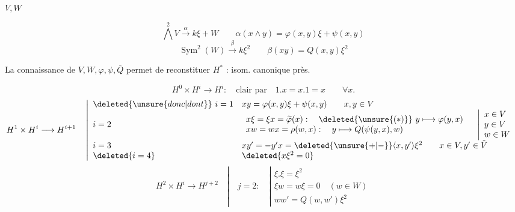 \begin{flushright}\end{flushright}

$V,W$

\[
\bigwedge^2 V\xrightarrow{\alpha}k\xi+W
\qquad \alpha(x\wedge y)=\varphi(x,y)\xi+\psi(x,y)
\]
\[
\operatorname{Sym}^2(W)\xrightarrow{\beta}k\xi^2
\qquad \beta(xy)=Q(x,y)\xi^2
\]

La connaissance de $V,W,\varphi,\psi,\bar Q$ permet de reconstituer $H^*$ :
isom. canonique près.

\[
H^0\times H^i\longrightarrow H^i:\quad\text{clair par}\quad
1.x=x.1=x\qquad\forall x.
\]
\[
H^1\times H^i\longrightarrow H^{i+1}\quad
\left|\begin{array}{ll}
\deleted{\unsure{donc|dont}}\ i=1&xy=\varphi(x,y)\xi+\psi(x,y)\qquad x,y\in V\\
i=2&\begin{array}{l}
x\xi=\xi x=\widetilde\varphi(x):\quad\deleted{\unsure{(*)}}\ y\longmapsto\varphi(y,x)\\
xw=wx=\rho(w,x):\quad y\longmapsto Q(\psi(y,x),w)
\end{array}\quad\left|\begin{array}{l}x\in V\\y\in V\\w\in W\end{array}\right.\\
i=3&xy'=-y'x=\deleted{\unsure{+|-}}\langle x,y'\rangle\xi^2\qquad x\in V,y'\in\check V\\
\deleted{i=4}&\deleted{x\xi^2=0}
\end{array}\right.
\]
\[
H^2\times H^i\longrightarrow H^{j+2}\quad
\left|\quad j=2:\quad\left|\begin{array}{l}
\xi.\xi=\xi^2\\
\xi w=w\xi=0\quad(w\in W)\\
ww'=Q(w,w')\xi^2
\end{array}\right.\right.
\]

